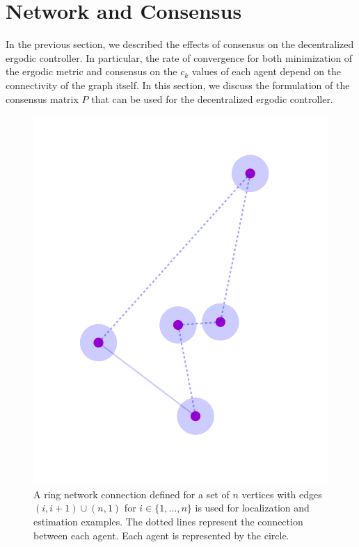 \documentclass[conference]{IEEEtran}
\begin{document}
\section{Network and Consensus} \label{sec:network}

In the previous section, we described the effects of consensus on the decentralized ergodic controller. In particular, the rate of convergence for both minimization of the ergodic metric and consensus on the $c_k$ values of each agent depend on the connectivity of the graph itself. In this section, we discuss the formulation of the consensus matrix $P$ that can be used for the decentralized ergodic controller.

\begin{figure}[th]
\centering
\includegraphics[scale=0.4]{figures/5networkpath.png}
\caption{ A ring network connection defined for a set of $n$ vertices with edges $(i,i+1) \cup (n,1)$ for $i \in \{1, \ldots, n\}$ is used for localization and estimation examples. The dotted lines represent the connection between each agent. Each agent is represented by the circle. }
\label{fig:path}
\end{figure}
\end{document}
